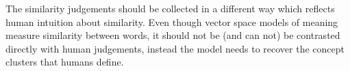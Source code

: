 \documentclass[11pt]{article}
\begin{document}
The similarity judgements should be collected in a different way which reflects human intuition about similarity. Even though vector space models of meaning measure similarity between words, it should not be (and can not) be contrasted directly with human judgements, instead the model needs to recover the concept clusters that humans define.



%
%



\balance
\end{document}
